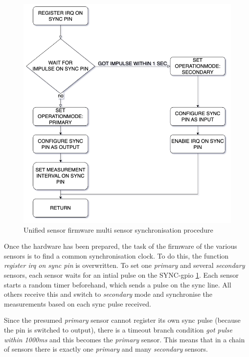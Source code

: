 \begin{figure}
\centering
\includegraphics{./generated_images/border_Unified_sensor_firmware_multi_sensor_synchronisation_procedure.png}
\caption{Unified sensor firmware multi sensor synchronisation procedure
\label{Unified_sensor_firmware_multi_sensor_synchronisation_procedure.png}}
\end{figure}

Once the hardware has been prepared, the task of the firmware of the
various sensors is to find a common synchronisation clock. To do this,
the function \emph{register irq on sync pin} is overwritten. To set one
\emph{primary} and several \emph{secondary} sensors, each sensor waits
for an intial pulse on the SYNC-\gls{gpio}
\ref{Unified_sensor_firmware_multi_sensor_synchronisation_procedure.png}.
Each sensor starts a random timer beforehand, which sends a pulse on the
sync line. All others receive this and switch to \emph{secondary} mode
and synchronise the measurements based on each sync pulse received.

Since the presumed \emph{primary} sensor cannot register its own sync
pulse (because the pin is switched to output), there is a timeout branch
condition \emph{got pulse within 1000ms} and this becomes the
\emph{primary} sensor. This means that in a chain of sensors there is
exactly one \emph{primary} and many \emph{secondary} sensors.

